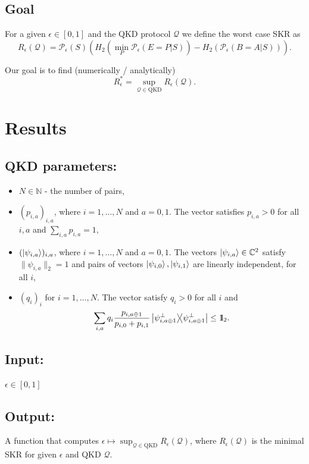 \documentclass[12pt,a4paper,reqno, aps, superscriptaddress]{amsart}
\newcommand{\Id}{{\rm 1\hspace{-0.9mm}l}}
\newcommand{\C}{\ensuremath{\mathbb{C}}}
\newcommand{\PP}{\ensuremath{\mathcal{P}}}
\newcommand{\QQ}{\ensuremath{\mathcal{Q}}}
\newcommand{\proj}[1]{\ensuremath{\ketbra{#1}{#1}}}
\begin{document}
\subsection{Goal}
For a given $\epsilon \in [0,1]$ and the QKD protocol $\QQ$ we define the worst 
case 
SKR as
\begin{equation}
R_\epsilon(\QQ) = \PP_\epsilon(S)(H_2(\min_P \PP_\epsilon(E=P|S)) - 
H_2(\PP_\epsilon(B=A|S))).
\end{equation}

Our goal is to find (numerically / analytically)
\begin{equation}
R^*_\epsilon = \sup_{\QQ \in \text{QKD}}R_\epsilon(\QQ).
\end{equation}

\section{Results}

\subsection{QKD parameters:}
\begin{itemize}
\item $N \in \mathbb{N}$ - the number of pairs,
\item $(p_{i,a})_{i,a}$, where $i=1,\ldots,N$ and $a=0,1$. The vector satisfies 
$p_{i,a} > 0$ for all $i,a$ and $\sum_{i,a} p_{i,a} = 1$,
\item $(\ket{\psi_{i,a}})_{i,a}$, where $i=1,\ldots,N$ and $a=0,1$. The vectors 
$\ket{\psi_{i,a}} \in \C^2$ satisfy $\|\psi_{i,a}\|_2=1$ and pairs of vectors 
$\ket{\psi_{i,0}}, \ket{\psi_{i,1}}$ 
are linearly independent, for all $i$,
\item $(q_i)_i$ for $i=1,\ldots,N$. The vector satisfy $q_i > 0$ for all $i$ 
and \begin{equation}
\sum_{i,a} 
q_i \frac{ p_{i,a \oplus 1}}{p_{i,0}+p_{i,1}} \proj{\psi_{i,a \oplus 1}^\perp} 
\le \Id_2.\end{equation}
\end{itemize}
\subsection{Input:}
$\epsilon \in [0,1]$
\subsection{Output:}
A function that computes $\epsilon \mapsto \sup_{\QQ \in \text{QKD}} 
R_\epsilon(\QQ)$, where 
$R_\epsilon(\QQ)$ is the minimal SKR for given $\epsilon$ and QKD $\QQ$.
\end{document}
